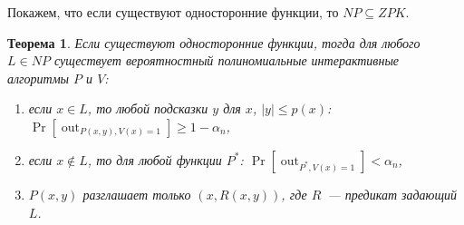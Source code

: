 \documentclass[12pt,a4paper]{article}
\DeclareMathOperator{\out}{out}
\theoremstyle{definition}
\theoremstyle{plain}
\newtheorem{theorem}{Теорема}[section]
\theoremstyle{remark}
\begin{document}
Покажем, что если существуют односторонние функции, то $NP\subseteq ZPK$.

\begin{theorem}
Если существуют односторонние функции, тогда для любого $L\in NP$ существует 
вероятностный полиномиальные интерактивные
алгоритмы $P$ и $V$:
\begin{enumerate}
\item если $x\in L$, то любой подсказки $y$ для $x$, $|y|\le p(x)$: $\Pr[\out_{P(x, y), V(x) = 1}]\ge 1-\alpha_n$,
\item если $x\not\in L$, то для любой функции $P^*$: $\Pr[\out_{P^*, V(x) = 1}] < \alpha_n$,
\item $P(x, y)$ разглашает только $(x, R(x,y))$, где $R$~--- предикат задающий $L$.
\end{enumerate}
\end{theorem}
\end{document}
